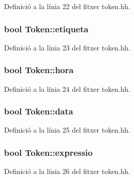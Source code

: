 Definició a la línia 22 del fitxer token.\-hh.

\hypertarget{class_token_a7d8393d74f62678dca433bde9957ba8e}{
\subsubsection[{etiqueta}]{\setlength{\rightskip}{0pt plus 5cm}bool Token\-::etiqueta\hspace{0.3cm}{\ttfamily [private]}}}\label{class_token_a7d8393d74f62678dca433bde9957ba8e}


Definició a la línia 23 del fitxer token.\-hh.

\hypertarget{class_token_a64b32630460ba9c9e43b0ab4954e346d}{
\subsubsection[{hora}]{\setlength{\rightskip}{0pt plus 5cm}bool Token\-::hora\hspace{0.3cm}{\ttfamily [private]}}}\label{class_token_a64b32630460ba9c9e43b0ab4954e346d}


Definició a la línia 24 del fitxer token.\-hh.

\hypertarget{class_token_af793ed1062684808c32526e66c0317da}{
\subsubsection[{data}]{\setlength{\rightskip}{0pt plus 5cm}bool Token\-::data\hspace{0.3cm}{\ttfamily [private]}}}\label{class_token_af793ed1062684808c32526e66c0317da}


Definició a la línia 25 del fitxer token.\-hh.

\hypertarget{class_token_a2f7bd6d2dc4ec43eeeb803c7ec66c4a9}{
\subsubsection[{expressio}]{\setlength{\rightskip}{0pt plus 5cm}bool Token\-::expressio\hspace{0.3cm}{\ttfamily [private]}}}\label{class_token_a2f7bd6d2dc4ec43eeeb803c7ec66c4a9}


Definició a la línia 26 del fitxer token.\-hh.

